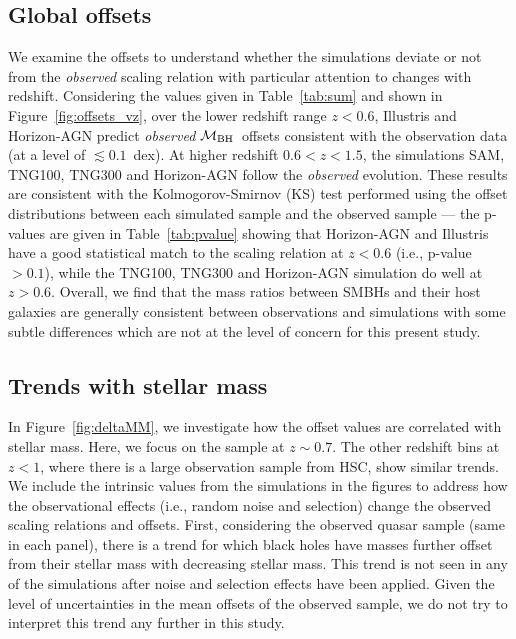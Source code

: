 \documentclass[twocolumn]{aastex631}
\def\mbh{$\mathcal M_{\rm BH}$}
\begin{document}
\subsection{Global offsets}
We examine the offsets to understand whether the simulations deviate or not from the {\it observed} scaling relation with particular attention to changes with redshift. Considering the values given in Table~\ref{tab:sum} and shown in Figure~\ref{fig:offsets_vz}, over the lower redshift range $z<0.6$, Illustris and Horizon-AGN predict {\it observed} \mbh\ offsets consistent with the observation data (at a level of $\lesssim0.1$~dex). At higher redshift $0.6<z<1.5$, the simulations SAM, TNG100, TNG300 and Horizon-AGN follow the {\it observed} evolution. These results are consistent with the Kolmogorov-Smirnov (KS) test performed using the offset distributions between each simulated sample and the observed sample --- the p-values are given in Table~\ref{tab:pvalue} showing that Horizon-AGN and Illustris have a good statistical match to the scaling relation at $z<0.6$ (i.e., p-value $> 0.1$), while the TNG100, TNG300 and Horizon-AGN simulation do well at $z>0.6$. Overall, we find that the mass ratios between SMBHs and their host galaxies are generally consistent between observations and simulations with some subtle differences which are not at the level of concern for this present study.


\subsection{Trends with stellar mass}
In Figure~\ref{fig:deltaMM}, we investigate how the offset values are correlated with stellar mass. Here, we focus on the sample at $z\sim0.7$. The other redshift bins at $z<1$, where there is a large observation sample from HSC, show similar trends. We include the intrinsic values from the simulations in the figures to address how the observational effects (i.e., random noise and selection) change the observed scaling relations and offsets. First, considering the observed quasar sample (same in each panel), there is a trend for which black holes have masses further offset from their stellar mass with decreasing stellar mass. This trend is not seen in any of the simulations after noise and selection effects have been applied. Given the level of uncertainties in the mean offsets of the observed sample, we do not try to interpret this trend any further in this study.
\end{document}
